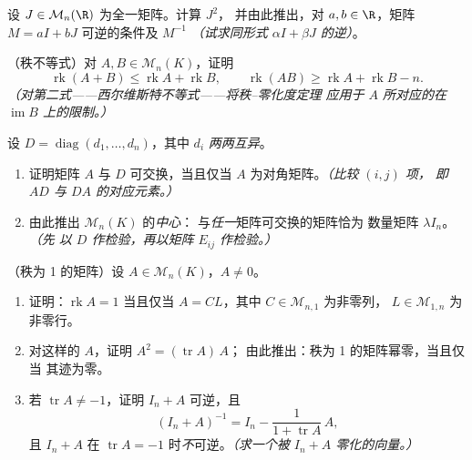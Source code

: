 \begin{exercise}[$\star\star\star$]\label{exo:b1:matrices:9}
设 $J \in \mathcal{M}_n(\R)$ 为全一矩阵。计算 $J^2$，
并由此推出，对 $a, b \in \R$，矩阵 $M
= aI + bJ$ 可逆的条件及 $M^{-1}$ \emph{（试求同形式
$\alpha I + \beta J$ 的逆）}。
\end{exercise}

\begin{exercise}[$\star\star\star$]\label{exo:b1:matrices:10}
（秩不等式）对 $A, B \in \mathcal{M}_n(K)$，证明
\[
\operatorname{rk}(A + B) \leq \operatorname{rk} A +
\operatorname{rk} B,
\qquad
\operatorname{rk}(AB) \geq \operatorname{rk} A + \operatorname{rk}
B - n .
\]
\emph{（对第二式——西尔维斯特不等式——将秩–零化度定理
应用于 $A$ 所对应的在
$\operatorname{im} B$ 上的限制。）}
\end{exercise}

\begin{exercise}[$\star\star$]\label{exo:b1:matrices:11}
设 $D = \operatorname{diag}(d_1, \dots, d_n)$，其中 $d_i$
\emph{两两互异}。
\begin{enumerate}
  \item 证明矩阵 $A$ 与 $D$ 可交换，当且仅当
        $A$ 为对角矩阵。\emph{（比较 $(i,j)$ 项，
        即 $AD$ 与 $DA$ 的对应元素。）}
  \item 由此推出 $\mathcal{M}_n(K)$ 的\emph{中心}：
        与\emph{任一}矩阵可交换的矩阵恰为
        数量矩阵 $\lambda I_n$。\emph{（先
        以 $D$ 作检验，再以矩阵 $E_{ij}$ 作检验。）}
\end{enumerate}
\end{exercise}

\begin{exercise}[$\star\star\star$]\label{exo:b1:matrices:12}
（秩为 1 的矩阵）设 $A \in \mathcal{M}_n(K)$，$A \neq 0$。
\begin{enumerate}
  \item 证明：$\operatorname{rk} A = 1$ 当且仅当 $A =
        CL$，其中 $C \in \mathcal{M}_{n,1}$ 为非零列，
        $L \in \mathcal{M}_{1,n}$ 为非零行。
  \item 对这样的 $A$，证明 $A^2 = (\operatorname{tr} A)\,A$；
        由此推出：秩为 1 的矩阵幂零，当且仅当
        其迹为零。
  \item 若 $\operatorname{tr} A \neq -1$，证明 $I_n + A$
        可逆，且
        \[
        (I_n + A)^{-1} = I_n - \frac{1}{1 + \operatorname{tr}
        A}\,A ,
        \]
        且 $I_n + A$ 在
        $\operatorname{tr} A = -1$ 时\emph{不}可逆。\emph{（求一个被
        $I_n + A$ 零化的向量。）}
\end{enumerate}
\end{exercise}

